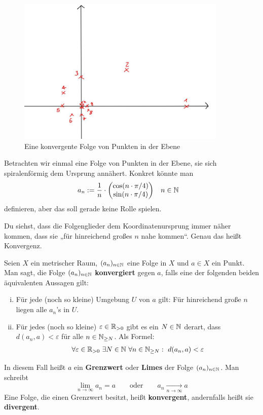 \begin{bem}[Intuition]
    \begin{figure}[ht]
        \includegraphics[width=10cm]{./_img/Spirale.jpeg}
        \centering \caption{Eine konvergente Folge von Punkten in der Ebene}
    \end{figure}
    Betrachten wir einmal eine Folge von Punkten in der Ebene, sie sich spiralenförmig dem Ursprung annähert. Konkret könnte man
    \begin{align*}
        a_n & := \frac{1}{n}\cdot \begin{pmatrix}
            \cos(n\cdot \pi/4) \\
            \sin(n\cdot \pi/4)
        \end{pmatrix} && n\in \mathbb N
    \end{align*}
    definieren, aber das soll gerade keine Rolle spielen.
    
    Du siehst, dass die Folgenglieder dem Koordinatenursprung immer näher kommen, dass sie „für hinreichend großes $n$ nahe kommen“. Genau das heißt Konvergenz.
\end{bem}


\begin{de}[Konvergenz] \label{def:konvergenz}    
    Seien $X$ ein metrischer Raum, $(a_n)_{n\in \mathbb N}$ eine Folge in $X$ und $a\in X$ ein Punkt. Man sagt, die Folge $(a_n)_{n\in \mathbb N}$ \textbf{konvergiert} gegen $a$, falls eine der folgenden beiden äquivalenten Aussagen gilt:
    \begin{enumerate}[(i)]
        \item Für jede (noch so kleine) Umgebung $U$ von $a$ gilt: Für hinreichend große $n$ liegen alle $a_n$'s in $U$.
        \item Für jedes (noch so kleine) $\varepsilon \in \mathbb R_{>0}$ gibt es ein $N\in \mathbb N$ derart, dass $d(a_n,a)<\varepsilon$ für alle $n\in \mathbb N_{\ge N}$. Als Formel:
        \begin{align*}
            \forall\varepsilon\in \mathbb R_{>0}\ \exists N\in\mathbb N\ \forall n\in \mathbb N_{\ge N}:\ d(a_n,a)<\varepsilon
        \end{align*}
    \end{enumerate}
    In diesem Fall heißt $a$ ein \textbf{Grenzwert} oder \textbf{Limes} der Folge $(a_n)_{n\in \mathbb N}$. Man schreibt
        \[ \lim_{n\to\infty}a_n=a \qquad\text{oder}\qquad a_n\xrightarrow[n\to \infty]{} a \]
    Eine Folge, die einen Grenzwert besitzt, heißt \textbf{konvergent}, andernfalls heißt sie \textbf{divergent}.
\end{de}


